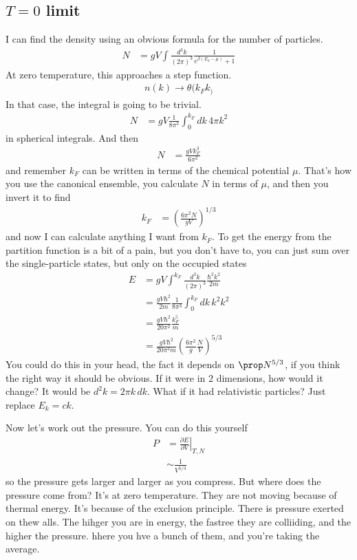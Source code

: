 \subsection{$T=0$ limit}
I can find the density using an obvious formula for the number of particles.
\begin{align}
    N &=
    gV \int \frac{d^{3}k}{\left( 2\pi \right)^3}
    \frac{1}{e^{\beta\left( E_k - \mu \right)} + 1}
\end{align}
At zero temperature,
this approaches a step function.
\begin{align}
    n(k) \to \theta(k_F k _)
\end{align}
In that case,
the integral is going to be trivial.
\begin{align}
    N &=
    gV \frac{1}{8\pi^3}
    \int_{0}^{k_F} dk\, 4\pi k^2
\end{align}
in spherical integrals.
And then
\begin{align}
    N &= \frac{gV k_F^3}{6\pi^2}
\end{align}
and remember $k_F$ can be written in terms of the chemical potential $\mu$.
That's how you use the canonical ensemble,
you calculate $N$ in terms of $\mu$,
and then you invert it to find
\begin{align}
    k_F &= \left( \frac{6\pi^2 N}{g V} \right)^{1/3}
\end{align}
and now I can calculate anything I want from $k_F$.
To get the energy from the partition function is a bit of a pain,
but you don't have to,
you can just sum over the single-particle states,
but only on the occupied states
\begin{align}
    E &=
    gV \int^{k_F} \frac{d^3k}{\left( 2\pi \right)^3}
    \frac{\hbar^2 k^2}{2m}\\
    &=
    \frac{gV \hbar^2}{2m}
    \frac{1}{8\pi^3}
    \int_{0}^{k_F} dk\, k^2 k^2\\
    &=
    \frac{gV\hbar^2}{20\pi^2} \frac{k_F^5}{m}\\
    &=
    \frac{gV \hbar^2}{20\pi^2 m}
    \left( \frac{6\pi^2}{g} \frac{N}{V} \right)^{5/3}
\end{align}
You could do this in your head,
the fact it depends on $\prop N^{5/3}$,
if you think the right way it should be obvious.
If it were in 2 dimensions,
how would it change?
It would be $d^2k = 2\pi k\,dk$.
What if it had relativistic particles?
Just replace $E_k = ck$.

Now let's work out the pressure. 
You can do this yourself
\begin{align}
    P &=
    \left.\frac{\partial E}{\partial V}\right|_{T,N}\\
    &\sim
    \frac{1}{V^{5/3}}
\end{align}
so the pressure gets larger and larger as you compress.
But where does the pressure come from?
It's at zero temperature.
They are not moving because of thermal energy.
It's because of the exclusion principle.
There is  pressure exerted on thew alls.
The hihger you are in energy,
the fastree they are colliiding,
and the higher the pressure.
hhere you hve a bunch of them,
and you're taking the average.

